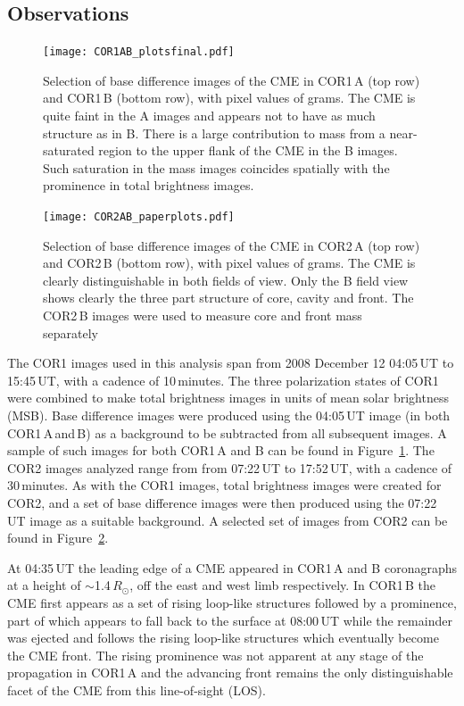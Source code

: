 \subsection{Observations}

\begin{figure}[h!]
\texttt{[image: COR1AB\_plotsfinal.pdf]}
\caption[2008-December-12 CMe observed by COR1] {Selection of base difference images of the CME in COR1\,A (top row) and COR1\,B (bottom row),  with pixel values of grams. The CME is 
quite faint in the A images and appears not to have as much structure as in B. There is a large contribution to mass from a near-saturated region to 
the upper flank of the CME in the B images. Such saturation in the mass images coincides spatially with the prominence in total brightness images.}
\label{fig:STEREO_COR1A&B}
\end{figure}

\begin{figure}[h!]
\texttt{[image: COR2AB\_paperplots.pdf]}
\caption [2008-December-12 CMe observed by COR2]{Selection of base difference images of the CME in COR2\,A (top row) and COR2\,B (bottom row), with pixel values of grams. The CME is 
clearly distinguishable in both fields of view. Only the B field view shows clearly the three part structure of core, cavity and front. The COR2\,B 
images were used to measure core and front mass separately}
\label{fig:STEREO_COR2A&B}
\end{figure}

The COR1 images used in this analysis span from 2008 December 12 04:05\,UT to 15:45\,UT, with a cadence of 10\,minutes. The three 
polarization states of COR1 were combined to make total brightness images in units of mean solar brightness (MSB). 
Base difference images were produced using the 04:05\,UT image (in both COR1\,A\,and\,B) as a background to be subtracted from all subsequent 
images. A sample of such images for both COR1\,A and B can be found in Figure~\ref{fig:STEREO_COR1A&B}. The COR2 images analyzed 
range from from 07:22\,UT to 17:52\,UT, with a cadence of 30\,minutes. As with the COR1 images, total brightness images were created for COR2, 
and a set of base difference images were then produced using the 07:22\,UT image as a suitable background. A selected set of images from COR2 
can be found in Figure~\ref{fig:STEREO_COR2A&B}. 
	
At 04:35\,UT the leading edge of a CME appeared in COR1\,A and B coronagraphs at a height of $\sim$1.4\,$R_{\odot}$, off the east and west 
limb respectively. In COR1\,B the CME first appears as a set of rising loop-like structures followed by a prominence, part of which appears to fall 
back to the surface at 08:00\,UT while the remainder was ejected and follows the rising loop-like structures which eventually become the CME front. 
The rising prominence was not apparent at any stage of the propagation in COR1\,A and the advancing front remains the only distinguishable facet 
of the CME from this line-of-sight (LOS).
		
